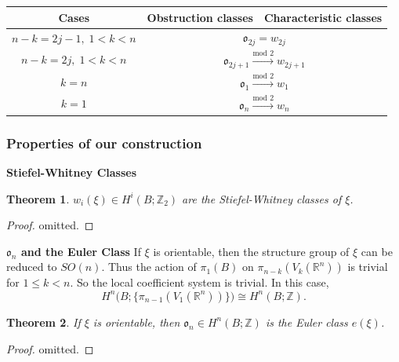 \documentclass[12pt,a4paper]{article}
\newtheorem{theorem}{\indent Theorem}%
\theoremstyle{definition}
\newcommand{\mZ}{\mathbb{Z}}
\newcommand{\mR}{\mathbb{R}}
\begin{document}
\begin{center}
\begin{table}[htbp]
\begin{tabular}{|c|cc|}
\hline
Cases              & \multicolumn{1}{c|}{Obstruction classes}       & Characteristic classes       \\ \hline
$n-k=2j-1,\;1<k<n$ & \multicolumn{2}{c|}{$\mathfrak{o}_{2j}=w_{2j}$}                               \\ \hline
$n-k=2j,\;1<k<n$   & \multicolumn{2}{c|}{$\mathfrak{o}_{2j+1}\xrightarrow{\text{mod } 2}w_{2j+1}$} \\ \hline
$k=n$              & \multicolumn{2}{c|}{$\mathfrak{o}_{1}\xrightarrow{\text{mod } 2}w_{1}$}       \\ \hline
$k=1$              & \multicolumn{2}{c|}{$\mathfrak{o}_{n}\xrightarrow{\text{mod } 2}w_{n}$}       \\ \hline
\end{tabular}
\end{table}
\end{center}

\subsubsection*{Properties of our construction}
\noindent\textbf{Stiefel-Whitney Classes}
\begin{theorem}
    $w_i(\xi)\in H^i(B;\mZ_2)$ are the Stiefel-Whitney classes of $\xi$.
\end{theorem}
\begin{proof}
    omitted.
\end{proof}

\noindent\textbf{$\mathfrak{o}_n$ and the Euler Class}
If $\xi$ is orientable, then the structure group of $\xi$ can be 
reduced to $SO(n)$. Thus the action of $\pi_1(B)$ on 
$\pi_{n-k}(V_k(\mR^n))$ is trivial for $1\leq k<n$. So the local 
coefficient system is trivial. In this case, 
\begin{equation*}
    H^n\Big(B;\big\{\pi_{n-1}(V_1(\mR^n))\big\}\Big) 
    \cong H^n(B;\mZ).
\end{equation*}
\begin{theorem}
    If $\xi$ is orientable, then $\mathfrak{o}_n\in H^n(B;\mZ)$ 
    is the Euler class $e(\xi)$.
\end{theorem}
\begin{proof}
    omitted.
\end{proof}
\end{document}
